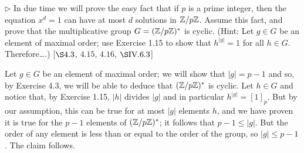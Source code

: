\begin{exercise}
	$\triangleright$ In due time we will prove the easy fact that if $p$ is a prime integer, then the equation $x^d = 1$ can have at most $d$ solutions in $\mathbb{Z}/p\mathbb{Z}$. Assume this fact, and prove that the multiplicative group $G = (\mathbb{Z}/p\mathbb{Z})^*$ is cyclic. (Hint: Let $g\in G$ be an element of maximal order; use Exercise 1.15 to show that $h^{|g|} = 1$ for all $h\in G$. Therefore\ldots .) [$\S4.3$, $4.15$, $4.16$, $\S\RNo{4}.6.3$]
\end{exercise}
\begin{solution}
	Let $g\in G$ be an element of maximal order; we will show that $|g| = p-1$ and so, by Exercise 4.3, we will be able to deduce that $(\mathbb{Z}/p\mathbb{Z})^\ast$ is cyclic. Let $h\in G$ and notice that, by Exercise 1.15, $|h|$ divides $|g|$ and in particular $h^{|g|} = [1]_{p}$. But by our assumption, this can be true for at most $|g|$ elements $h$, and we have proven it is true for the $p-1$ elements of $(\mathbb{Z}/p\mathbb{Z})^\ast$; it follows that $p-1 \leq |g|$. But the order of any element is less than or equal to the order of the group, so $|g| \leq p-1$. The claim follows.
\end{solution}

